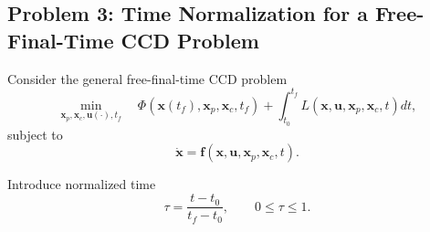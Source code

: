 \subsection*{Problem 3: Time Normalization for a Free-Final-Time CCD Problem}

Consider the general free-final-time CCD problem
\begin{equation}
\min_{\mathbf{x}_p,\mathbf{x}_c,\mathbf{u}(\cdot),t_f}
\quad
\Phi
\left(
\mathbf{x}(t_f),
\mathbf{x}_p,
\mathbf{x}_c,
t_f
\right)
+
\int_{t_0}^{t_f}
L
\left(
\mathbf{x},
\mathbf{u},
\mathbf{x}_p,
\mathbf{x}_c,
t
\right)dt,
\end{equation}
subject to
\begin{equation}
\dot{\mathbf{x}}
=
\mathbf{f}
\left(
\mathbf{x},
\mathbf{u},
\mathbf{x}_p,
\mathbf{x}_c,
t
\right).
\end{equation}

Introduce normalized time
\begin{equation}
\tau
=
\frac{t-t_0}{t_f-t_0},
\qquad
0\leq\tau\leq1.
\end{equation}

